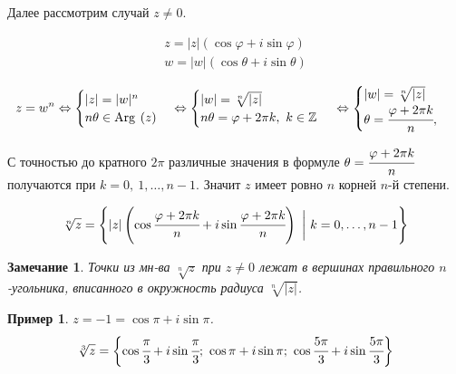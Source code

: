 \documentclass[a4paper,12pt]{article}
\newtheorem*{Examples}{Пример}
\newtheorem*{Comment}{Замечание}
\renewcommand{\Re}{\mathrm{Re\:}}
\renewcommand{\Im}{\mathrm{Im\:}}
\newcommand{\Arg}{\mathrm{Arg\:}}
\begin{document}
Далее рассмотрим случай $z \neq 0$. 

\begin{gather*}
z = |z|\left(\cos\varphi+i\sin\varphi\right)\\
w = |w|\left(\cos\theta+i\sin\theta\right)
\end{gather*}

\[
z = w^n \Leftrightarrow
\begin{cases}
|z| = |w|^n \\
n\theta\in\Arg\left(z\right)
\end{cases}
\Leftrightarrow
\begin{cases}
|w|= \sqrt[n]{|z|}\\
n\theta= \varphi+2\pi k,\ k\in \mathbb Z
\end{cases}\\
\Leftrightarrow
\begin{cases}
|w|=\sqrt[n]{|z|}\\
\theta = \cfrac{\varphi+2\pi k}{n},\
\end{cases}
\]

С точностью до кратного $2\pi$ различные значения в формуле $\theta = \cfrac{\varphi+2\pi k }{n}$ получаются при $k = 0,\ 1,\ldots,n-1$. Значит $z$ имеет ровно $n$ корней $n$-й степени. 

\[ \sqrt[n]{z} = \Biggl\{|z|\left(\cos\cfrac{\varphi+2\pi k}{n}+i\sin\cfrac{\varphi+2\pi k }{n}\right)\ \biggl|\ k=0,\ldots,n-1\Biggr\}
\]

\begin{Comment}
Точки из мн-ва $\sqrt[n]{z}$ при $z\neq 0$ лежат в вершинах правильного $n$-угольника, вписанного в окружность радиуса $\sqrt[n]{|z|}$. 
\end{Comment}

\begin{Examples}
$z=-1=\cos\pi+i\sin\pi$. 
\[
\sqrt[3]{z} = \biggl\{ \cos\cfrac\pi3+i\sin\cfrac\pi3;\ \cos\pi+i\sin\pi;\ \cos\cfrac{5\pi}{3}+i\sin\cfrac{5\pi}{3} \biggl\}
\]
\end{Examples}

\end{document}
